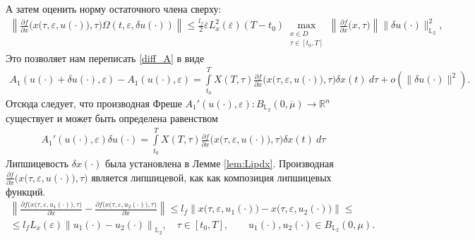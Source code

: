 \documentclass[../main.tex]{subfiles}
\begin{document}
А затем оценить норму остаточного члена сверху:
\begin{gather*}
	\left\| 
	\frac{\partial f}{\partial x} \Big(x\big(\tau,\varepsilon, u(\cdot)\big), \tau\Big) \Omega(t,\varepsilon, \delta u(\cdot)) 
	\right\| 
	\leqslant
	\frac{l_f}{2}
	\overline{\varepsilon} 
	L_x^2(\overline{\varepsilon})
	(T-t_0)
	\max_{\substack{x\in D \\ \tau \in [t_0,T]}} 
	\left\|\frac{\partial f}{\partial x} \Big(x, \tau\Big) \right\|
	\|\delta u(\cdot)\|_{\mathbb{L}_2}^2,
\end{gather*}
Это позволяет нам переписать \eqref{diff_A} в виде
\begin{gather}
	A_1(u(\cdot) + \delta u(\cdot),\varepsilon) - A_1(u(\cdot) ,\varepsilon) = \int\limits_{t_0}^T X(T,\tau) \frac{\partial f}{\partial x}  \Big(x\big(\tau,\varepsilon, u(\cdot)\big), \tau\Big) \delta x(t) \ d\tau + o(\|\delta u(\cdot)\|^2).
\end{gather}
Отсюда следует, что производная Фреше  $A_1'(u(\cdot),\varepsilon): B_{\mathbb{L}_2}(0,\overline{\mu}) \to \mathbb{R}^n $ существует и может быть определена равенством
\begin{gather}\label{A1_diff}
	A_1'(u(\cdot),\varepsilon)\delta u(\cdot) = \int\limits_{t_0}^T X(T,\tau) \frac{\partial f}{\partial x}  \Big(x\big(\tau,\varepsilon, u(\cdot)\big), \tau\Big) \delta x(t) \ d\tau 
\end{gather}
Липшицевость $\delta x(\cdot)$ была установлена в Лемме \ref{lem:Lipdx}. 
Производная $\frac{\partial f}{\partial x} \Big(x\big(\tau,\varepsilon, u(\cdot)\big),\tau\Big)$ является липшицевой, как как композиция липшицевых функций.
\begin{gather*}
	\left\| \frac{\partial f \Big(x\big(\tau,\varepsilon, u_1(\cdot)\big),\tau\Big)} {\partial x} - \frac{\partial f \Big(x\big(\tau,\varepsilon, u_2(\cdot)\big),\tau\Big)} {\partial x} \right\| \leqslant l_f \left\|x\big(\tau,\varepsilon, u_1(\cdot) \big) - x\big(\tau,\varepsilon, u_2(\cdot)\big) \right\| \leqslant \\ \leqslant l_f L_x(\varepsilon) \left\| u_1(\cdot) - u_2(\cdot) \right\|_{\mathbb{L}_2}, \quad \tau \in [t_0, T], \qquad u_1(\cdot), u_2(\cdot) \in B_{\mathbb{L}_2}(0,\mu).
\end{gather*}
\end{document}
